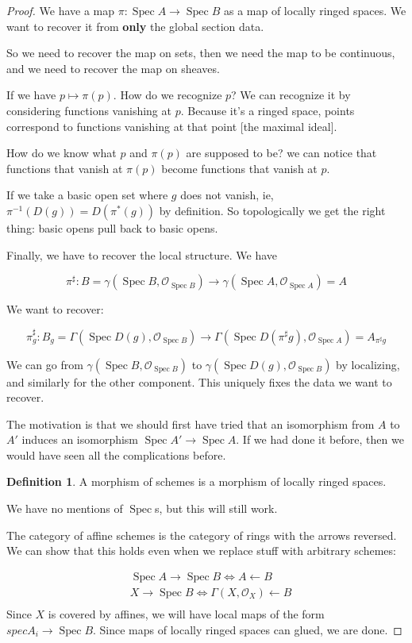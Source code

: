 \documentclass{book}
\renewcommand{\O}{\ensuremath{\mathcal{O}}}
\newcommand{\Spec}{\operatorname{Spec}}
\newcommand{\spec}{\operatorname{Spec}}
\theoremstyle{definition}
\newtheorem{definition}[theorem]{Definition}
\begin{document}
\begin{proof}
We have a map $\pi: \spec A \rightarrow \spec B$ as a map of locally ringed spaces.
We want to recover it from \textbf{only} the global section data.

So we need to recover the map on sets, then we need the map to be continuous,
and we need to recover the map on sheaves.

If we have $p \mapsto \pi(p)$. How do we recognize $p$? We can recognize it
by considering functions vanishing at $p$. Because it's a ringed space, points
correspond to functions vanishing at that point [the maximal ideal]. 

How do we know what $p$ and $\pi(p)$ are supposed to be? we can notice that
functions that vanish at $\pi(p)$ become functions that vanish at $p$.

If we take a basic open set where $g$ does not vanish, ie, $\pi^{-1}(D(g)) = D(\pi^*(g))$
by definition. So topologically we get the right thing: basic opens pull back
to basic opens.

Finally, we have to recover the local structure. We have

$$
\pi^{\sharp}:  B = \gamma(\Spec B, \O_{\spec B}) \rightarrow \gamma (\Spec A, \O_{\spec A}) = A
$$

We want to recover:


$$
\pi^{\sharp}_g: B_g =   \Gamma(\Spec D(g), \O_{\spec B}) \rightarrow \Gamma (\Spec D(\pi^\sharp g), \O_{\spec A}) = A_{\pi^\sharp g}
$$

We can go from $\gamma(\Spec B, \O_{\spec B})$ to $\gamma(\Spec D(g), \O_{\spec B})$
by localizing, and similarly for the other component. This uniquely fixes the
data we want to recover.

The motivation is that we should first have tried that an isomorphism from
$A$ to $A'$ induces an isomorphism $\Spec A' \rightarrow \Spec A$. If we had
done it before, then we would have seen all the complications before. 

\begin{definition}
A morphism of schemes is a morphism of locally ringed spaces.
\end{definition}

We have no mentions of $\spec$s, but this will still work.

The category of affine schemes is the category of rings with the arrows reversed.
We can show that this holds even when we replace stuff with arbitrary schemes:

\begin{align*}
&\spec A \rightarrow \spec B \iff A \leftarrow B \\
&X \rightarrow \spec B \iff \Gamma(X, \O_X) \leftarrow B \\
\end{align*}
Since $X$ is covered by affines, we will have local maps of the form $spec A_i \rightarrow \spec B$.
Since maps of locally ringed spaces can glued, we are done.



\end{proof}
\end{document}
